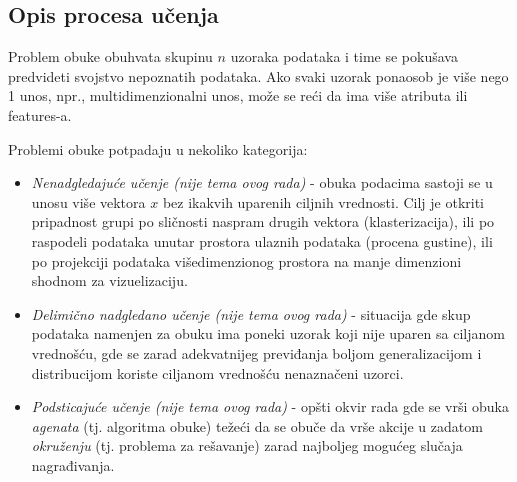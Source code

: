 \documentclass[fontsize=12bp, paper=a4]{scrarticle}
\begin{document}
\subsection{Opis procesa učenja\cite{supervised}}
Problem obuke obuhvata skupinu $n$ uzoraka podataka i time se pokušava predvideti svojstvo nepoznatih podataka. Ako svaki uzorak ponaosob je više nego 1 unos, npr., multidimenzionalni unos, može se reći da ima više atributa ili features-a.
\\
\justifying

Problemi obuke potpadaju u nekoliko kategorija:
\begin{itemize}
    \item \textit{Nenadgledajuće učenje (nije tema ovog rada)} - obuka podacima sastoji se u unosu više vektora $x$ bez ikakvih uparenih ciljnih vrednosti. Cilj je otkriti pripadnost grupi po sličnosti naspram drugih vektora (klasterizacija), ili po raspodeli podataka unutar prostora ulaznih podataka (procena gustine), ili po projekciji podataka višedimenzionog prostora na manje dimenzioni shodnom za vizuelizaciju.
    
    \item \textit{Delimično nadgledano učenje (nije tema ovog rada)\cite{semi}} - situacija gde skup podataka namenjen za obuku ima poneki uzorak koji nije uparen sa ciljanom vrednošću, gde se zarad adekvatnijeg previđanja boljom generalizacijom i distribucijom koriste ciljanom vrednošću nenaznačeni uzorci.
    
    \item \textit{Podsticajuće učenje (nije tema ovog rada)\cite{rl}} - opšti okvir rada gde se vrši obuka \textit{agenata} (tj. algoritma obuke) težeći da se obuče da vrše akcije u zadatom \textit{okruženju} (tj. problema za rešavanje) zarad najboljeg mogućeg slučaja nagrađivanja. 


\end{itemize}
\end{document}
